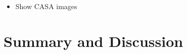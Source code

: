 \documentclass[twocolumn]{aastex63}
\begin{document}
\begin{itemize}
\item Show CASA images
\end{itemize}

\section{Summary and Discussion} \label{sec:discuss}




\end{document}
